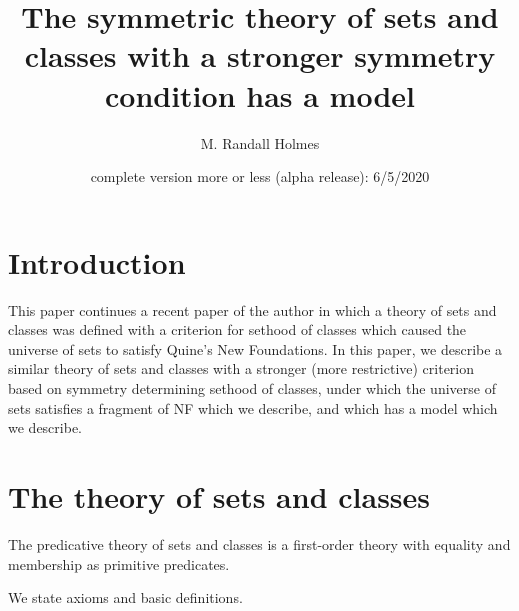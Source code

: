 \documentclass{article}
\title{The symmetric theory of sets and classes with a stronger symmetry condition has a model}
\author{M. Randall Holmes}
\date{complete version more or less (alpha release):  6/5/2020}
\begin{document}
\maketitle

\section{Introduction}

This paper continues a recent paper of the  author in which a theory of sets and classes was defined with a criterion for sethood of classes which
caused the universe of sets to satisfy Quine's New Foundations.  In this paper, we describe a similar theory of sets and classes with a stronger (more restrictive) criterion based on symmetry determining sethood of classes, under which the universe of sets satisfies a fragment of NF which we describe, and which has a model which we describe.

\section{The theory of sets and classes}

The predicative theory of sets and classes is a first-order theory with equality and membership as primitive predicates.

We state axioms and basic definitions.
\end{document}

